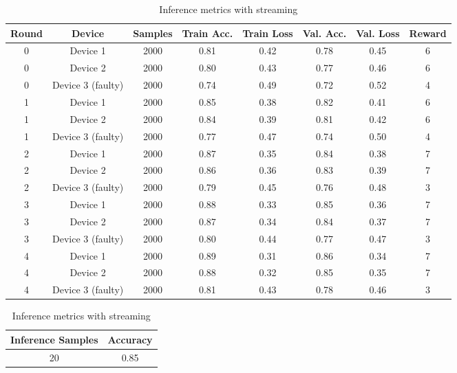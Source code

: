 \begin{table}[h!]
\begin{table}[h!]
    \centering
    \caption{Training metrics with streaming chunks}
    \label{tab:streaming_chunks}
    \begin{tabular}{c c c c c c c c}
        \toprule
        \textbf{Round} & \textbf{Device} & \textbf{Samples} & \textbf{Train Acc.} & \textbf{Train Loss} & \textbf{Val. Acc.} & \textbf{Val. Loss} & \textbf{Reward} \\
        \midrule
        0 & Device 1 & 2000 & 0.81 & 0.42 & 0.78 & 0.45 & 6 \\
        0 & Device 2 & 2000 & 0.80 & 0.43 & 0.77 & 0.46 & 6 \\
        0 & Device 3 (faulty) & 2000 & 0.74 & 0.49 & 0.72 & 0.52 & 4 \\
        1 & Device 1 & 2000 & 0.85 & 0.38 & 0.82 & 0.41 & 6 \\
        1 & Device 2 & 2000 & 0.84 & 0.39 & 0.81 & 0.42 & 6 \\
        1 & Device 3 (faulty) & 2000 & 0.77 & 0.47 & 0.74 & 0.50 & 4 \\
        2 & Device 1 & 2000 & 0.87 & 0.35 & 0.84 & 0.38 & 7 \\
        2 & Device 2 & 2000 & 0.86 & 0.36 & 0.83 & 0.39 & 7 \\
        2 & Device 3 (faulty) & 2000 & 0.79 & 0.45 & 0.76 & 0.48 & 3 \\
        3 & Device 1 & 2000 & 0.88 & 0.33 & 0.85 & 0.36 & 7 \\
        3 & Device 2 & 2000 & 0.87 & 0.34 & 0.84 & 0.37 & 7 \\
        3 & Device 3 (faulty) & 2000 & 0.80 & 0.44 & 0.77 & 0.47 & 3 \\
        4 & Device 1 & 2000 & 0.89 & 0.31 & 0.86 & 0.34 & 7 \\
        4 & Device 2 & 2000 & 0.88 & 0.32 & 0.85 & 0.35 & 7 \\
        4 & Device 3 (faulty) & 2000 & 0.81 & 0.43 & 0.78 & 0.46 & 3 \\
        \bottomrule
    \end{tabular}
\end{table}

\begin{table}[h!]
    \centering
    \caption{Inference metrics with streaming}
    \label{tab:streaming_inference}
    \begin{tabular}{c c}
        \toprule
        \textbf{Inference Samples} & \textbf{Accuracy} \\
        \midrule
        20 & 0.85 \\
        \bottomrule
    \end{tabular}
\end{table}


\end{table}
